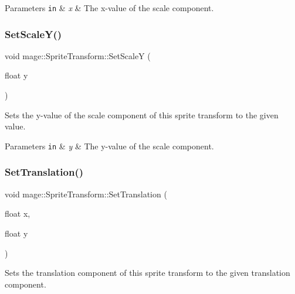 \begin{DoxyParams}[1]{Parameters}
\mbox{\tt in}  & {\em x} & The x-\/value of the scale component. \\
\hline
\end{DoxyParams}
\hypertarget{structmage_1_1_sprite_transform_a321067fab6d62931e17f1604ce50709d}{}\label{structmage_1_1_sprite_transform_a321067fab6d62931e17f1604ce50709d} 
\subsubsection{\texorpdfstring{Set\+Scale\+Y()}{SetScaleY()}}
{\footnotesize\ttfamily void mage\+::\+Sprite\+Transform\+::\+Set\+ScaleY (\begin{DoxyParamCaption}\item[{float}]{y }\end{DoxyParamCaption})}

Sets the y-\/value of the scale component of this sprite transform to the given value.


\begin{DoxyParams}[1]{Parameters}
\mbox{\tt in}  & {\em y} & The y-\/value of the scale component. \\
\hline
\end{DoxyParams}
\hypertarget{structmage_1_1_sprite_transform_aa8e838691b090b12ed275aeb61413d80}{}\label{structmage_1_1_sprite_transform_aa8e838691b090b12ed275aeb61413d80} 
\subsubsection{\texorpdfstring{Set\+Translation()}{SetTranslation()}\hspace{0.1cm}{\footnotesize\ttfamily [1/3]}}
{\footnotesize\ttfamily void mage\+::\+Sprite\+Transform\+::\+Set\+Translation (\begin{DoxyParamCaption}\item[{float}]{x,  }\item[{float}]{y }\end{DoxyParamCaption})}

Sets the translation component of this sprite transform to the given translation component.


